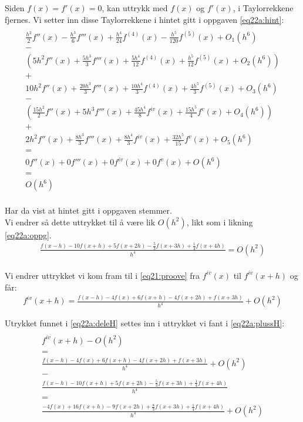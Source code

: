 Siden $f(x) = f'(x) = 0$, kan uttrykk med $f(x)$ og $f'(x)$, i Taylorrekkene fjernes. Vi setter inn disse Taylorrekkene i hintet gitt i oppgaven \ref{eq22a:hint}: 
\begin{multline}
\\ \frac{h^2}{2}f''(x)-\frac{h^3}{6}f'''(x)+\frac{h^4}{24}f^{(4)}(x)-\frac{h^5}{120}f^{(5)}(x)+{O_1}(h^6) \\
-\\
(5{h^2}f''(x) + \frac{{5{h^3}}}{3}f'''(x) + \frac{{5{h^4}}}{{12}}{f^{(4)}}(x) + \frac{{{h^5}}}{{12}}{f^{(5)}}(x) + {O_2}(h^6)) \\
+ \\
10{h^2}f''(x) + \frac{{20{h^3}}}{3}f'''(x) + \frac{{10{h^4}}}{3}{f^{(4)}}(x) + \frac{{4{h^5}}}{3}{f^{(5)}}(x) + {O_3}(h^6) \\
- \\
(\frac{{15{h^2}}}{2}f''(x) + 5{h^3}f'''(x) + \frac{{45{h^4}}}{8}{f^{iv}}(x) + \frac{{15{h^5}}}{4}{f^v}(x) + {O_4}(h^6)) \\
+ \\
2{h^2}f''(x) + \frac{{8{h^3}}}{3}f'''(x) + \frac{{8{h^4}}}{3}{f^{iv}}(x) + \frac{{32{h^5}}}{{15}}{f^v}(x) + {O_5}(h^6) \\
= \\
0f''(x)+0f'''(x)+0f^{iv}(x)+0f^{v}(x)+O(h^6) \\
= \\
O(h^6) \\
\end{multline}


Har da vist at hintet gitt i oppgaven stemmer. \\ 
Vi endrer så dette uttrykket til å være lik $O(h^2)$, likt som i likning \ref{eq22a:oppg}. 
\begin{align}
\frac{f(x-h)-10f(x+h)+5f(x+2h)-\frac{5}{3}f(x+3h)+\frac{1}{4}f(x+4h)}{h^4}=O(h^2) 
\label{eq22a:deleH} \\ \nonumber
\end{align}


Vi endrer uttrykket vi kom fram til i \ref{eq21:proove} fra ${f^{iv}}(x)$ til ${f^{iv}}(x + h)$ og får: 
\begin{align}
{f^{iv}}(x + h) = \frac{{f(x - h) - 4f(x) + 6f(x + h) - 4f(x + 2h) + f(x + 3h)}}{{{h^4}}} + O({h^2}) \label{eq22a:plussH} 
\end{align}


Utrykket funnet i \ref{eq22a:deleH} settes inn i uttrykket vi fant i \ref{eq22a:plussH}:
\begin{multline}
\\{f^{iv}}(x + h) - O(h^2) \\
= \\
\frac{f(x-h)-4f(x)+6f(x+h)-4f(x+2h)+f(x+3h)}{h^4}+O(h^2) \\
- \\
\frac{f(x-h)-10f(x+h)+5f(x+2h)-\frac{5}{3}f(x+3h)+\frac{1}{4}f(x+4h)}{h^4} \\
= \\
\frac{-4f(x)+16f(x+h)-9f(x+2h)+\frac{8}{3}f(x+3h)+\frac{1}{4}f(x+4h)}{h^4}+O(h^2) \\ \nonumber \\ \nonumber
\end{multline}

